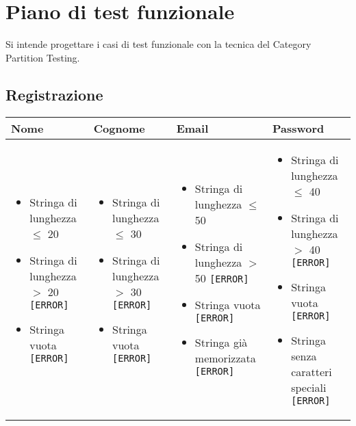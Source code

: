 \chapter{Piano di test funzionale}
Si intende progettare i casi di test funzionale con la tecnica del Category Partition Testing. 

\section{Registrazione}

\begin{table}[H]
\begin{tabularx}{\textwidth}{|X|X|X|X|}
\hline
\textbf{Nome} & \textbf{Cognome} & \textbf{Email} & \textbf{Password} \\
\hline
\begin{itemize}[leftmargin=*]
\item Stringa di lunghezza $\leq$ 20
\item Stringa di lunghezza $>$ 20 \texttt{[ERROR]}
\item Stringa vuota \texttt{[ERROR]}
\end{itemize} &
\begin{itemize}[leftmargin=*]
\item Stringa di lunghezza $\leq$ 30
\item Stringa di lunghezza $>$ 30 \texttt{[ERROR]}
\item Stringa vuota \texttt{[ERROR]}
\end{itemize} &
\begin{itemize}[leftmargin=*]
\item Stringa di lunghezza $\leq$ 50
\item Stringa di lunghezza $>$ 50 \texttt{[ERROR]}
\item Stringa vuota \texttt{[ERROR]}
\item Stringa già memorizzata \texttt{[ERROR]}
\end{itemize} &
\begin{itemize}[leftmargin=*]
\item Stringa di lunghezza $\leq$ 40
\item Stringa di lunghezza $>$ 40 \texttt{[ERROR]}
\item Stringa vuota \texttt{[ERROR]}
\item Stringa senza caratteri speciali \texttt{[ERROR]}
\end{itemize} \\
\hline
\end{tabularx}
\end{table}

